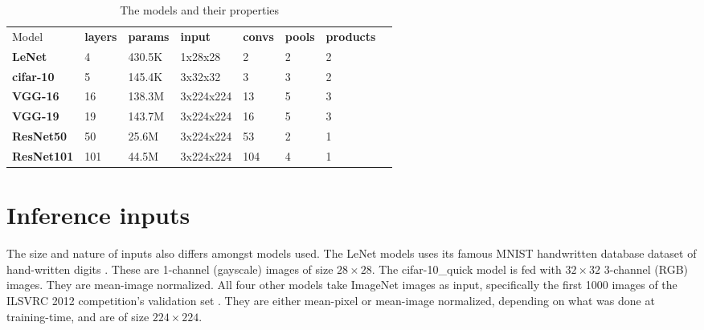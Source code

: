 \begin{table}[]
\centering
\caption[Model properties]{The models and their properties}
\label{tbl:models}
\begin{tabular}{|l|l|l|l|l|l|l|l}
\cline{1-7}
Model & \textbf{layers} & \textbf{params} & \textbf{input} & \textbf{convs} & \textbf{pools} & \textbf{products} &  \\ \cline{1-7}
\textbf{LeNet}     & 4               & 430.5K              & 1x28x28             & 2                     & 2                 & 2                       &  \\ \cline{1-7}
\textbf{cifar-10}  & 5               & 145.4K              & 3x32x32             & 3                     & 3                 & 2                       &  \\ \cline{1-7}
\textbf{VGG-16}    & 16              & 138.3M              & 3x224x224           & 13                    & 5                 & 3                       &  \\ \cline{1-7}
\textbf{VGG-19}    & 19              & 143.7M              & 3x224x224           & 16                    & 5                 & 3                       &  \\ \cline{1-7}
\textbf{ResNet50}  & 50              & 25.6M               & 3x224x224           & 53                    & 2                 & 1                       &  \\ \cline{1-7}
\textbf{ResNet101} & 101             & 44.5M               & 3x224x224           & 104                   & 4                 & 1                       &  \\ \cline{1-7}
\end{tabular}
\end{table}

\section{Inference inputs}
The size and nature of inputs also differs amongst models used. The LeNet models uses its famous MNIST handwritten database dataset of hand-written digits \cite{mnist}. These are 1-channel (gayscale) images of size $28\times28$. The cifar-10\_quick model is fed with $32\times32$ 3-channel (RGB) images. They are mean-image normalized. All four other models take ImageNet images as input, specifically the first 1000 images of the ILSVRC 2012 competition's validation set \cite{imagenet}. They are either mean-pixel or mean-image normalized, depending on what was done at training-time, and are of size $224\times224$.

